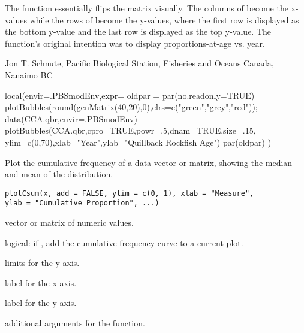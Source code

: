 \documentclass[letterpaper]{book}
\begin{document}
%
\begin{Details}\relax
The function  essentially flips the  matrix 
visually. The columns of  become the x-values while the rows of
 become the y-values, where the first row is displayed as the
bottom y-value and the last row is displayed as the top y-value. The 
function's original intention was to display proportions-at-age vs. year.
\end{Details}
%
\begin{Author}\relax
Jon T. Schnute, Pacific Biological Station, Fisheries and Oceans Canada, Nanaimo BC
\end{Author}
%
\begin{SeeAlso}\relax
{}
\end{SeeAlso}
%
\begin{Examples}
\begin{ExampleCode}
local(envir=.PBSmodEnv,expr={
  oldpar = par(no.readonly=TRUE)
  plotBubbles(round(genMatrix(40,20),0),clrs=c("green","grey","red"));
  data(CCA.qbr,envir=.PBSmodEnv)
  plotBubbles(CCA.qbr,cpro=TRUE,powr=.5,dnam=TRUE,size=.15,
    ylim=c(0,70),xlab="Year",ylab="Quillback Rockfish Age")
  par(oldpar)
})
\end{ExampleCode}
\end{Examples}
%
\begin{Description}\relax
Plot the cumulative frequency of a data vector or matrix, 
showing the median and mean of the distribution.
\end{Description}
%
\begin{Usage}
\begin{verbatim}
plotCsum(x, add = FALSE, ylim = c(0, 1), xlab = "Measure", 
ylab = "Cumulative Proportion", ...)  
\end{verbatim}
\end{Usage}
%
\begin{Arguments}
\begin{ldescription}
\item[\code{x}] vector or matrix of numeric values.
\item[\code{add}] logical: if , add the cumulative frequency curve to a current plot.
\item[\code{ylim}] limits for the y-axis.
\item[\code{xlab}] label for the x-axis.
\item[\code{ylab}] label for the y-axis.
\item[\code{...}] additional arguments for the  function.
\end{ldescription}
\end{Arguments}
\end{document}
